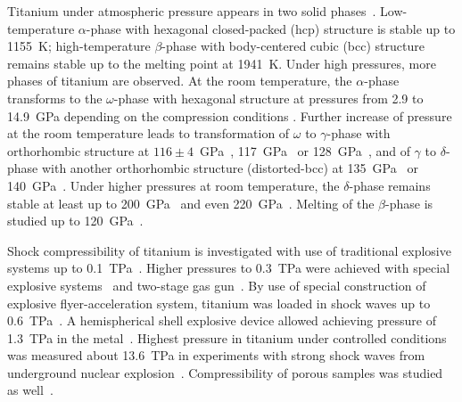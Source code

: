 \documentclass[a4paper]{jpconf}
\begin{document}
Titanium under atmospheric pressure appears in two solid phases~\cite{Tonkov-1979}. Low-temperature $\alpha$-phase with hexagonal closed-packed (hcp) structure is stable up to 1155~K; high-temperature $\beta$-phase with body-centered cubic (bcc) structure remains stable up to the melting point at 1941~K. Under high pressures, more phases of titanium are observed. At the room temperature, the $\alpha$-phase transforms to the $\omega$-phase with hexagonal structure at pressures from 2.9 to 14.9~GPa depending on the compression conditions \cite{Errandonea-Meng-Somayazulu-Hausermann-PB-2005}. Further increase of pressure at the room temperature leads to transformation of $\omega$ to $\gamma$-phase with orthorhombic structure at $116\pm 4$~GPa~\cite{Vohra-Spencer-PRL-2001}, 117~GPa~\cite{Dewaele-Stutzmann-Bouchet-Bottin-Occelli-Mezouar-PRB-2015} or 128~GPa~\cite{Akahama-Kawamura-LeBihan-PRL-2001}, and of $\gamma$ to $\delta$-phase with another orthorhombic structure (distorted-bcc) at 135~GPa~\cite{Dewaele-Stutzmann-Bouchet-Bottin-Occelli-Mezouar-PRB-2015} or 140~GPa~\cite{Akahama-Kawamura-LeBihan-PRL-2001}. Under higher pressures at room temperature, the $\delta$-phase remains stable at least up to 200~GPa~\cite{Dewaele-Stutzmann-Bouchet-Bottin-Occelli-Mezouar-PRB-2015} and even 220~GPa~\cite{Akahama-Kawamura-LeBihan-PRL-2001}. Melting of the $\beta$-phase is studied up to 120~GPa~\cite{Stutzmann-Dewaele-Bouchet-Bottin-Mezouar-PRB-2015}.

Shock compressibility of titanium is investigated with use of traditional explosive systems up to 0.1~TPa~\cite{Walsh-Rice-McQueen-Yarger-PR-1957, McQueen-Marsh-JAP-1960, McQueen-Marsh-Taylor-Fritz-Carter-1970-proc, LASL-1980}. Higher pressures to 0.3~TPa were achieved with special explosive systems~\cite{Krupnikov-Bakanova-Brazhnik-Trunin-DAN-1963} and two-stage gas gun~\cite{Isbell-Shipman-Jones-1968}. By use of special construction of explosive flyer-acceleration system, titanium was loaded in shock waves up to 0.6~TPa~\cite{Altshuler-Bakanova-Dudoladov-Dynin-Trunin-Chekin-1981}. A hemispherical shell explosive device allowed achieving pressure of 1.3~TPa in the metal~\cite{Trunin-Panov-Medvedev-JETP-Lett-1995}. Highest pressure in titanium under controlled conditions was measured about 13.6~TPa in experiments with strong shock waves from underground nuclear explosion~\cite{Trunin-1994-eng, Trunin-Ilkaeva-Podurets-Popov-Pechenkin-Prokhorov-Sevastyanov-Khrustalev-HT-1994}. Compressibility of porous samples was studied as well~\cite{Trunin-Simakov-Medvedev-HT-1999}.
\end{document}
